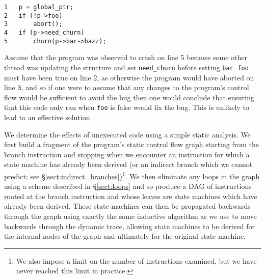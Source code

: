 \documentclass[10pt,letter,twocolumn]{sigplanconf}
\begin{document}
\begin{verbatim}
1   p = global_ptr;
2   if (!p->foo)
3       abort();
4   if (p->need_churn)
5       churn(p->bar->bazz);
\end{verbatim}

Assume that the program was observed to crash on line 5 because some
other thread was updating the structure and set \verb|need_churn|
before setting \verb|bar|.  \verb|foo| must have been true on line 2,
as otherwise the program would have aborted on line \verb|3|, and so
if one were to assume that any changes to the program's control flow
would be sufficient to avoid the bug then one would conclude that
ensuring that this code only ran when \verb|foo| is false would fix
the bug.  This is unlikely to lead to an effective solution.

We determine the effects of unexecuted code using a simple static
analysis.  We first build a fragment of the program's static control
flow graph starting from the branch instruction and stopping when we
encounter an instruction for which a state machine has already been
derived (or an indirect branch which we cannot predict; see
\S\ref{sect:indirect_branches})\footnote{We also impose a limit on the
  number of instructions examined, but we have never reached this
  limit in practice.}.  We then eliminate any loops in the graph using
a scheme described in \S\ref{sect:loops} and so produce a DAG of
instructions rooted at the branch instruction and whose leaves are
state machines which have already been derived.  These state machines
can then be propagated backwards through the graph using exactly the
same inductive algorithm as we use to move backwards through the
dynamic trace, allowing state machines to be derived for the internal
nodes of the graph and ultimately for the original state machine.
\end{document}
